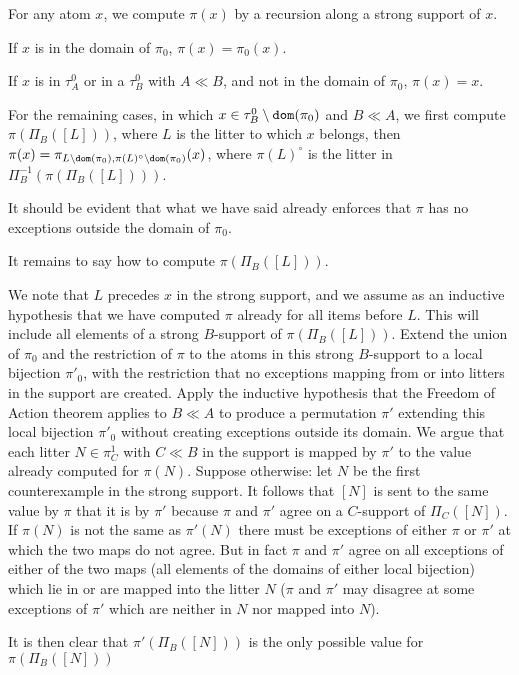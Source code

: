 \documentclass{slides}
\begin{document}
\begin{slide}

For any atom $x$, we compute $\pi(x)$ by a recursion along a strong support of $x$. 

If $x$ is in the domain of $\pi_0$, $\pi(x) = \pi_0(x)$.

If $x$ is in $\tau^0_A$ or in a $\tau^0_B$ with $A \ll B$, and not in the domain of $\pi_0$, $\pi(x)=x$.

For the remaining cases, in which $x \in \tau^0_B \setminus {\tt dom}(\pi_0)$ and $B \ll A$, we first compute $\pi(\Pi_B([L]))$, where $L$ is the litter to which $x$ belongs,
then $\pi(x) = \pi_{L \setminus {\tt dom}(\pi_0),\pi(L)^\circ \setminus {\tt dom}(\pi_0)}(x)$, where $\pi(L)^\circ$ is the litter in $\Pi_B^{-1}(\pi(\Pi_B([L])))$.

It should be evident that what we have said already enforces that $\pi$ has no exceptions outside the domain of $\pi_0$.

It remains to say how to compute $\pi(\Pi_B([L]))$.

We note that $L$ precedes $x$ in the strong support, and we assume as an inductive hypothesis that we have computed $\pi$ already for all items before $L$.
This will include all elements of a strong $B$-support of $\pi(\Pi_B([L]))$.  Extend the union of $\pi_0$ and the restriction of $\pi$ to the atoms in this strong $B$-support to a local bijection $\pi'_0$, with the restriction
that no exceptions mapping from or into litters in the support are created.  Apply the inductive hypothesis that the Freedom of Action theorem applies to $B\ll A$ to produce
a permutation $\pi'$ extending this local bijection $\pi'_0$ without creating exceptions outside its domain.   We argue that each litter $N\in \pi^1_C$ with $C\ll B$ in the support is mapped by $\pi'$ to the value
already computed for $\pi(N)$.  Suppose otherwise:  let $N$ be the first counterexample in the strong support.  It follows that $[N]$ is sent to the same value by $\pi$ that it is by $\pi'$ because $\pi$ and $\pi'$ agree on a $C$-support of $\Pi_C([N])$.  If $\pi(N)$ is not the same as $\pi'(N)$ there must be exceptions of either $\pi$ or $\pi'$ at which the two maps do not agree.  But in fact $\pi$ and $\pi'$ agree on all exceptions of either of the two maps (all elements of the domains of either local bijection) which lie in or are mapped into the litter $N$ ($\pi$ and $\pi'$ may disagree at some exceptions of $\pi'$ which are neither in $N$ nor mapped into $N$).

It is then clear that $\pi'(\Pi_B([N]))$ is the only possible value for  $\pi(\Pi_B([N]))$

\end{slide}
\end{document}
